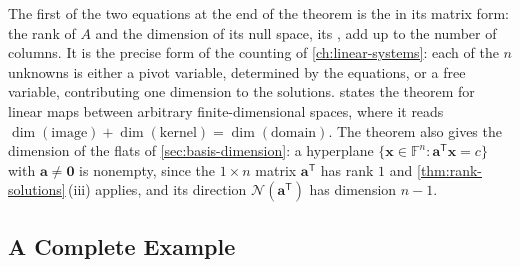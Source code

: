 The first of the two equations at the end of the theorem is the  in its matrix form: the rank of $A$ and the dimension of its null space, its , add up to the number of columns. It is the precise form of the counting of \cref{ch:linear-systems}: each of the $n$ unknowns is either a pivot variable, determined by the equations, or a free variable, contributing one dimension to the solutions.  states the theorem for linear maps between arbitrary finite-dimensional spaces, where it reads $\dim(\text{image})+\dim(\text{kernel})=\dim(\text{domain})$. The theorem also gives the dimension of the flats of \cref{sec:basis-dimension}: a hyperplane $\{\mathbf x\in\mathbb F^n: \mathbf a^{\mathsf T}\mathbf x=c\}$ with $\mathbf a\ne\mathbf 0$ is nonempty, since the $1\times n$ matrix $\mathbf a^{\mathsf T}$ has rank $1$ and \cref{thm:rank-solutions}\,(iii) applies, and its direction $\mathcal N(\mathbf a^{\mathsf T})$ has dimension $n-1$.

\subsection{A Complete Example}

